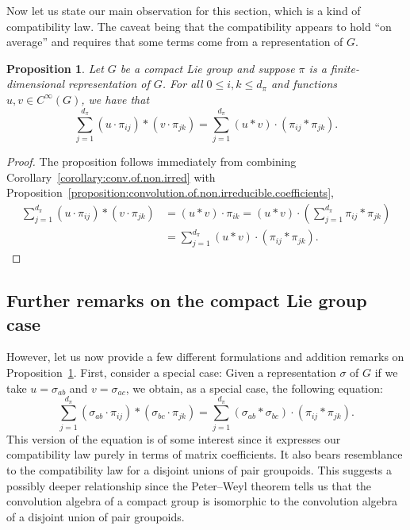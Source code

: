 \documentclass[10pt,a4paper]{amsart}
\numberwithin{equation}{section}
\newtheorem{Proposition}[Theorem]{Proposition}
\theoremstyle{definition}
\begin{document}
Now let us state our main observation for this section, which is a kind of compatibility law. The caveat being that the compatibility appears to hold ``on average'' and requires that some terms come from a representation of $ G $.
\begin{Proposition}\label{proposition:new.weak.compatibility}
Let $ G $ be a compact Lie group and suppose $ \pi $ is a finite-dimensional representation of $ G $. For all
  $0 \le i,k \le d_\pi $
  and functions $ u, v \in C^\infty(G) $, we have that
\begin{equation*}\label{eqn:thm.weakly.hopeful}
  \sum_{j=1}^{d_\pi} (u \cdot \pi_{ij}) * ( v \cdot \pi_{jk} ) = \sum_{j=1}^{d_\pi} (u * v) \cdot (\pi_{ij} * \pi_{jk} ).
  \end{equation*}
\end{Proposition}
\begin{proof}
The proposition follows immediately from combining Corollary~\ref{corollary:conv.of.non.irred} with Proposition~\ref{proposition:convolution.of.non.irreducible.coefficients},
 \begin{align*}
 \sum_{j=1}^{d_\pi} ( u \cdot \pi_{ij}) * ( v \cdot \pi_{jk}) &= (u * v) \cdot \pi_{ik} = (u * v) \cdot \left( \sum_{j=1}^{d_\pi} \pi_{ij} * \pi_{jk} \right) \\
 &= \sum_{j=1}^{d_\pi} (u * v) \cdot ( \pi_{ij} * \pi_{jk} ). \tag*{\qed}
 \end{align*}\renewcommand{\qed}{}
\end{proof}

\subsection{Further remarks on the compact Lie group case}\label{subsection:further.remarks}
However, let us now provide a few different formulations and addition remarks on Proposition~\ref{proposition:new.weak.compatibility}. First, consider a special case: Given a representation $ \sigma $ of $ G $ if we take $ u = \sigma_{ab} $ and $ v = \sigma_{ac} $, we obtain, as a special case, the following equation:
\begin{equation}\label{eqn:new.compatibility.in.basis}
  \sum_{j=1}^{d_\pi} ( \sigma_{ab} \cdot \pi_{ij} ) * (\sigma_{bc} \cdot \pi_{jk} ) = \sum_{j=1}^{d_\pi} (\sigma_{ab} * \sigma_{bc} ) \cdot (\pi_{ij} * \pi_{jk}).
\end{equation}
This version of the equation is of some interest since it expresses our compatibility law purely in terms of matrix coefficients. It also bears resemblance to the compatibility law for a disjoint unions of pair groupoids.
This suggests a possibly deeper relationship since the Peter--Weyl theorem tells us that the convolution algebra of a compact group is isomorphic to the convolution algebra of a disjoint union of pair groupoids.
\end{document}
